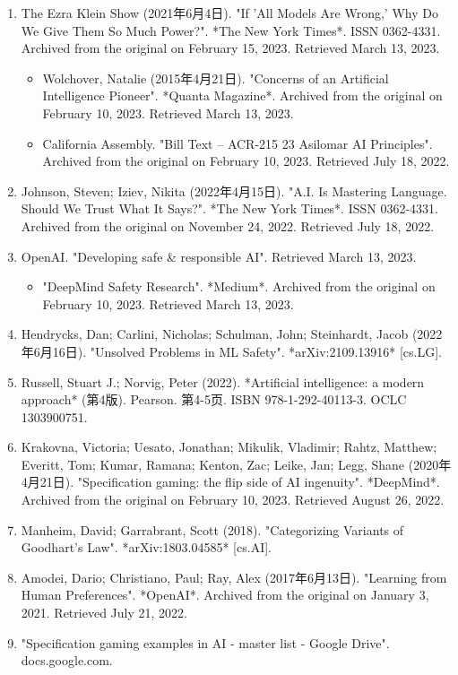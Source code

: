 \begin{enumerate}
\item The Ezra Klein Show (2021年6月4日). "If 'All Models Are Wrong,' Why Do We Give Them So Much Power?". *The New York Times*. ISSN 0362-4331. Archived from the original on February 15, 2023. Retrieved March 13, 2023.
\begin{itemize}
\item Wolchover, Natalie (2015年4月21日). "Concerns of an Artificial Intelligence Pioneer". *Quanta Magazine*. Archived from the original on February 10, 2023. Retrieved March 13, 2023.
\item California Assembly. "Bill Text – ACR-215 23 Asilomar AI Principles". Archived from the original on February 10, 2023. Retrieved July 18, 2022.
\end{itemize}
\item Johnson, Steven; Iziev, Nikita (2022年4月15日). "A.I. Is Mastering Language. Should We Trust What It Says?". *The New York Times*. ISSN 0362-4331. Archived from the original on November 24, 2022. Retrieved July 18, 2022.
\item OpenAI. "Developing safe & responsible AI". Retrieved March 13, 2023.
\begin{itemize}
\item "DeepMind Safety Research". *Medium*. Archived from the original on February 10, 2023. Retrieved March 13, 2023.
\end{itemize}
\item Hendrycks, Dan; Carlini, Nicholas; Schulman, John; Steinhardt, Jacob (2022年6月16日). "Unsolved Problems in ML Safety". *arXiv:2109.13916* [cs.LG].
\item Russell, Stuart J.; Norvig, Peter (2022). *Artificial intelligence: a modern approach* (第4版). Pearson. 第4-5页. ISBN 978-1-292-40113-3. OCLC 1303900751.
\item Krakovna, Victoria; Uesato, Jonathan; Mikulik, Vladimir; Rahtz, Matthew; Everitt, Tom; Kumar, Ramana; Kenton, Zac; Leike, Jan; Legg, Shane (2020年4月21日). "Specification gaming: the flip side of AI ingenuity". *DeepMind*. Archived from the original on February 10, 2023. Retrieved August 26, 2022.
\item Manheim, David; Garrabrant, Scott (2018). "Categorizing Variants of Goodhart's Law". *arXiv:1803.04585* [cs.AI].
\item Amodei, Dario; Christiano, Paul; Ray, Alex (2017年6月13日). "Learning from Human Preferences". *OpenAI*. Archived from the original on January 3, 2021. Retrieved July 21, 2022.
\item "Specification gaming examples in AI - master list - Google Drive". docs.google.com.

\end{enumerate}
